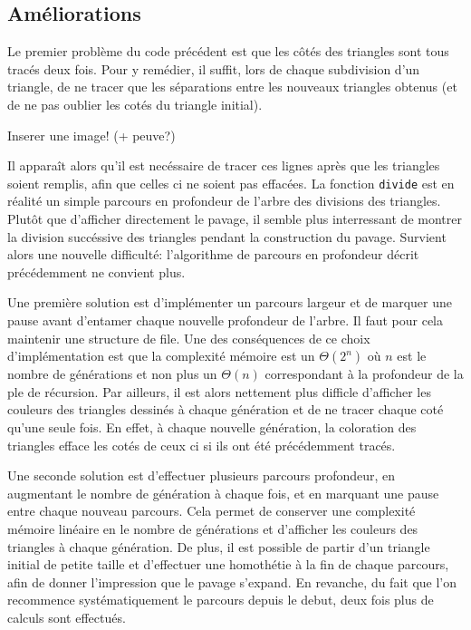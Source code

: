\documentclass[a4paper, 11pt]{article}%
\begin{document}
	\subsection{Améliorations}

		Le premier problème du code précédent est que les
                côtés des triangles sont tous tracés deux fois. Pour y
                remédier, il suffit, lors de chaque subdivision d'un
                triangle, de ne tracer que les séparations entre les
                nouveaux triangles obtenus (et de ne pas oublier les
                cotés du triangle initial).

		Inserer une image! (+ peuve?)

		Il apparaît alors qu'il est necéssaire de tracer ces
                lignes après que les triangles soient remplis, afin
                que celles ci ne soient pas effacées.
		La fonction \texttt{divide} est en réalité un simple
                parcours en profondeur de l'arbre des divisions des
                triangles.
		Plutôt que d'afficher directement le pavage, il semble
                plus interressant de montrer la division succéssive
                des triangles pendant la construction du
                pavage. Survient alors une nouvelle difficulté:
                l'algorithme de parcours en profondeur décrit
                précédemment ne convient plus.

 
		Une première solution est d'implémenter un parcours
                largeur et de marquer une pause avant d'entamer chaque
                nouvelle profondeur de l'arbre. Il faut pour cela
                maintenir une structure de file. Une des conséquences
                de ce choix d'implémentation est que la
                complexité mémoire est un $\Theta(2^{n})$ où $n$ est le
                nombre de générations et non plus un $\Theta(n)$
                correspondant à la profondeur de la ple de récursion.
                Par ailleurs, il est
                alors nettement plus difficle d'afficher les couleurs
                des triangles dessinés à chaque génération et de ne
                tracer chaque coté qu'une seule fois. En effet, à
                chaque nouvelle génération, la coloration des
                triangles efface les cotés de ceux ci si ils ont été
                précédemment tracés. 
                
                Une seconde solution est d'effectuer plusieurs
                parcours profondeur, en augmentant le nombre de
                génération à chaque fois, et en marquant une pause
                entre chaque nouveau parcours. Cela permet de
                conserver une complexité mémoire linéaire en le nombre
                de générations et d'afficher les couleurs des triangles
                à chaque génération. De plus, il est possible de
                partir d'un triangle initial de petite taille et 
                d'effectuer une homothétie à la fin de chaque
                parcours, afin de donner l'impression que le pavage
                s'expand.
                En revanche, du fait que l'on recommence
                systématiquement le parcours depuis le debut, deux
                fois plus de calculs sont effectués.
\end{document}
